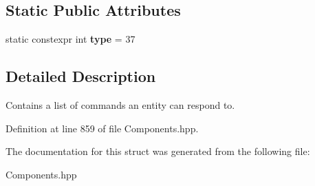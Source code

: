 \subsection*{Static Public Attributes}
\begin{DoxyCompactItemize}
\item 
static constexpr int {\bfseries type} = 37\hypertarget{struct_command_component_a94546ca7cae51cc4b41231815159e437}{}\label{struct_command_component_a94546ca7cae51cc4b41231815159e437}

\end{DoxyCompactItemize}


\subsection{Detailed Description}
Contains a list of commands an entity can respond to. 

Definition at line 859 of file Components.\+hpp.



The documentation for this struct was generated from the following file\+:\begin{DoxyCompactItemize}
\item 
Components.\+hpp\end{DoxyCompactItemize}
